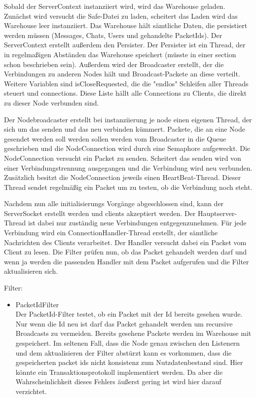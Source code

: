\documentclass[a4paper]{article}
\theoremstyle{definition}
\begin{document}
    Sobald der ServerContext instanziiert wird, wird das Warehouse geladen. Zunächst wird versucht die Safe-Datei zu laden, scheitert das Laden wird das Warehouse leer instanziiert. Das Warehouse hält sämtliche Daten, die persistiert werden müssen (Messages, Chats, Users und gehandelte PacketIds). Der ServerContext erstellt außerdem den Persister. Der Persister ist ein Thread, der in regelmaßigen Abständen das Warehouse speichert (müsste in einer section schon beschrieben sein). Außerdem wird der Broadcaster erstellt, der die Verbindungen zu anderen Nodes hält und Broadcast-Packete an diese verteilt.
    Weitere Variablen sind isCloseRequested, die die "endlos" Schleifen aller Threads steuert und connections. Diese Liste hällt alle Connections zu Clients, die direkt zu dieser Node verbunden sind.

    Der Nodebroadcaster erstellt bei instanziierung je node einen eigenen Thread, der sich um das senden und das neu verbinden kümmert.
    Packete, die an eine Node gesendet werden soll werden sollen werden vom Broadcaster in die Queue geschrieben und die NodeConnection wird durch eine Semaphore aufgeweckt. Die NodeConnection versucht ein Packet zu senden. Scheitert das senden wird von einer Verbindungstrennung ausgegangen und die Verbindung wird neu verbunden.
    Zusätzlich besitzt die NodeConnection jeweils einen HeartBeat-Thread. Dieser Thread sendet regelmäßig ein Packet um zu testen, ob die Verbindung noch steht.

    Nachdem nun alle initialisierungs Vorgänge abgeschlossen sind, kann der ServerSocket erstellt werden und clients akzeptiert werden.
    Der Hauptserver-Thread ist dabei nur zuständig neue Verbindungen entgegenzunehmen. Für jede Verbindung wird ein ConnectionHandler-Thread erstellt, der sämtliche Nachrichten des Clients verarbeitet. Der Handler versucht dabei ein Packet vom Client zu lesen. Die Filter prüfen nun, ob das Packet gehandelt werden darf und wenn ja werden die passenden Handler mit dem Packet aufgerufen und die Filter aktualisieren sich.


    Filter:
    \begin{itemize}
        \item PacketIdFilter\\
            Der PacketId-Filter testet, ob ein Packet mit der Id bereits gesehen wurde. Nur wenn die Id neu ist darf das Packet gehandelt werden um recursive Broadcasts zu vermeiden. Bereits gesehene Packete werden im Warehouse mit gespeichert. Im seltenen Fall, dass die Node genau zwischen den Listenern und dem aktualisieren der Filter abstürzt kann es vorkommen, dass die gespeicherten packet ids nicht konsistenz zum Nutzdatenbestand sind. Hier könnte ein Transaktionsprotokoll implementiert werden. Da aber die Wahrscheinlichkeit dieses Fehlers äußerst gering ist wird hier darauf verzichtet.
    \end{itemize}
   
\end{document}
